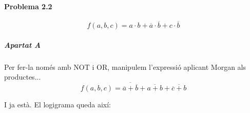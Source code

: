 



\startpage
\paragraph{Problema 2.2}

\begin{equation*}
  f(a,b,c) = a \cdot b + \overline{a} \cdot \overline{b} + c \cdot \overline{b}
\end{equation*}

\vspace{0.5em}


\subparagraph{Apartat A}

Per fer-la només amb \textsf{NOT} i \textsf{OR}, manipulem l'expressió aplicant Morgan als productes...
%
\begin{equation*}
  f(a,b,c) = \overline{\overline{a} + \overline{b}} + \overline{a + b} + \overline{\overline{c} + b}
\end{equation*}

I ja està. El logigrama queda així:

